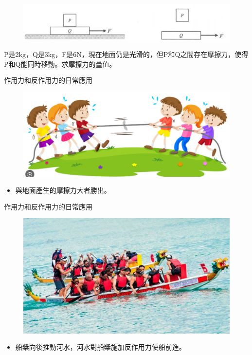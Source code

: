 \documentclass[beamer=true]{standalone}
\begin{document}
\begin{eg}
    \begin{figure}[h!]
        \centering
        \includegraphics[width=.8\textwidth]{assets/5c3215d2.png}
    \end{figure}
    P是2kg，Q是3kg，F是6N，現在地面仍是光滑的，但P和Q之間存在摩擦力，使得P和Q能同時移動。求摩擦力的量值。
\end{eg}

\begin{frame}{作用力和反作用力的日常應用}
    \begin{figure}[h!]
        \centering
        \includegraphics[width=.8\textwidth]{assets/ae0d3530.png}
    \end{figure}
    \begin{itemize}\bigskip
        \item 與地面產生的摩擦力大者勝出。
    \end{itemize}
\end{frame}
\begin{frame}{作用力和反作用力的日常應用}
    \begin{figure}[h!]
        \centering
        \includegraphics[width=.75\textwidth]{assets/45e1912d.png}
    \end{figure}
    \begin{itemize}
        \item 船槳向後推動河水，河水對船槳施加反作用力使船前進。
    \end{itemize}
\end{frame}
\end{document}

